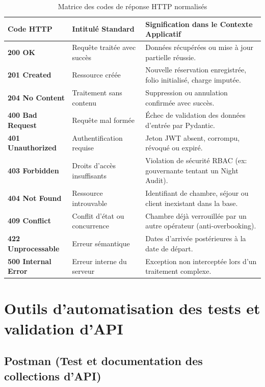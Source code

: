 \begin{table}[H]
\centering
\small
\renewcommand{\arraystretch}{1.3}
\begin{tabularx}{\textwidth}{|p{2.5cm}|p{3.5cm}|X|}
\hline
\textbf{Code HTTP} & \textbf{Intitulé Standard} & \textbf{Signification dans le Contexte Applicatif} \\
\hline
\textbf{200 OK} & Requête traitée avec succès & Données récupérées ou mise à jour partielle réussie. \\
\hline
\textbf{201 Created} & Ressource créée & Nouvelle réservation enregistrée, folio initialisé, charge imputée. \\
\hline
\textbf{204 No Content} & Traitement sans contenu & Suppression ou annulation confirmée avec succès. \\
\hline
\textbf{400 Bad Request} & Requête mal formée & Échec de validation des données d'entrée par Pydantic. \\
\hline
\textbf{401 Unauthorized} & Authentification requise & Jeton JWT absent, corrompu, révoqué ou expiré. \\
\hline
\textbf{403 Forbidden} & Droits d'accès insuffisants & Violation de sécurité RBAC (ex: gouvernante tentant un Night Audit). \\
\hline
\textbf{404 Not Found} & Ressource introuvable & Identifiant de chambre, séjour ou client inexistant dans la base. \\
\hline
\textbf{409 Conflict} & Conflit d'état ou concurrence & Chambre déjà verrouillée par un autre opérateur (anti-overbooking). \\
\hline
\textbf{422 Unprocessable} & Erreur sémantique & Dates d'arrivée postérieures à la date de départ. \\
\hline
\textbf{500 Internal Error} & Erreur interne du serveur & Exception non interceptée lors d'un traitement complexe. \\
\hline
\end{tabularx}
\caption{Matrice des codes de réponse HTTP normalisés}
\label{tab:api_codes_detail}
\end{table}

\section{Outils d'automatisation des tests et validation d'API}

\subsection{Postman (Test et documentation des collections d'API)}


